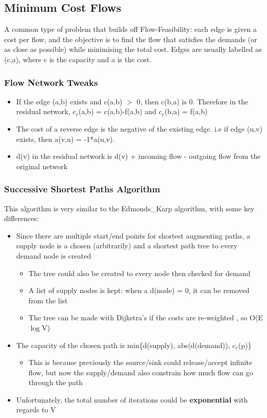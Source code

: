 \subsection{Minimum Cost Flows}
A common type of problem that builds off Flow-Feasibility: each edge is given a cost per flow, and the objective is to find the flow that satisfies the demands (or as close as possible) while minimising the total cost. Edges are usually labelled as (c,a), where c is the capacity and a is the cost. 

\subsubsection{Flow Network Tweaks}
\begin{itemize}
    \item If the edge (a,b) exists and c(a,b) $>$ 0, then c(b,a) is 0. Therefore in the residual network, $c_r$(a,b) = c(a,b)-f(a,b) and $c_r$(b,a) = f(a,b)
    \item The cost of a reverse edge is the negative of the existing edge. i.e if edge (u,v) exists, then a(v,u) = -1*a(u,v). 
    \item d(v) in the residual network is d(v) + incoming flow - outgoing flow from the original network
\end{itemize}

\subsubsection{Successive Shortest Paths Algorithm}
This algorithm is very similar to the Edmonds\_Karp algorithm, with some key differences:
\begin{itemize}
    \item Since there are multiple start/end points for shortest augmenting paths, a supply node is a chosen (arbitrarily) and a shortest path tree to every demand node is created
    \begin{itemize}
        \item The tree could also be created to every node then checked for demand
        \item A list of supply nodes is kept: when a d(node) = 0, it can be removed from the list
        \item The tree can be made with Dijkstra's if the costs are re-weighted , so O(E $\log$V)
    \end{itemize}
    \item The capacity of the chosen path is min\{d(supply), abs(d(demand)), $c_r$(p)\}
    \begin{itemize}
        \item This is because previously the source/sink could release/accept infinite flow, but now the supply/demand also constrain how much flow can go through the path
    \end{itemize}
    \item Unfortunately, the total number of iterations could be \textbf{exponential} with regards to V
\end{itemize}

